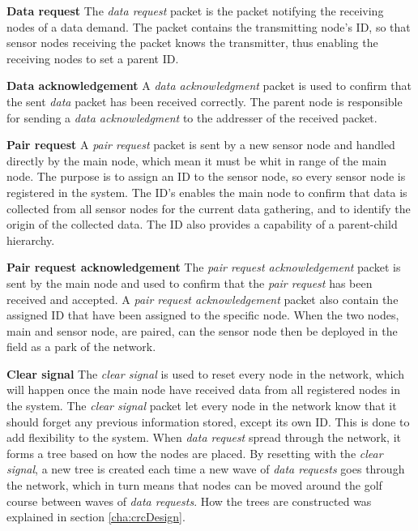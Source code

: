 \textbf{Data request}\newline 
The \textit{data request} packet is the packet notifying the receiving nodes of a data demand. 
The packet contains the transmitting node's ID, so that sensor nodes receiving the packet knows the transmitter, thus enabling the receiving nodes to set a parent ID.

\textbf{Data acknowledgement}\newline
A \textit{data acknowledgment} packet is used to confirm that the sent \textit{data} packet has been received correctly. The parent node is responsible for sending a \textit{data acknowledgment} to the addresser of the received packet. 

\textbf{Pair request}\newline
A \textit{pair request} packet is sent by a new sensor node and handled directly by the main node, which mean it must be whit in range of the main node. The purpose is to assign an ID to the sensor node, so every sensor node is registered in the system. The ID's enables the main node to confirm that data is collected from all sensor nodes for the current data gathering, and to identify the origin of the collected data. The ID also provides a capability of a parent-child hierarchy.

\textbf{Pair request acknowledgement}\newline
The \textit{pair request acknowledgement} packet is sent by the main node and used to confirm that the \textit{pair request} has been received and accepted. A \textit{pair request acknowledgement} packet also contain the assigned ID that have been assigned to the specific node. When the two nodes, main and sensor node, are paired, can the sensor node then be deployed in the field as a park of the network. 

\textbf{Clear signal}\newline
The \textit{clear signal} is used to reset every node in the network, which will happen once the main node have received data from all registered nodes in the system.
The \textit{clear signal} packet let every node in the network know that it should forget any previous information stored, except its own ID. This is done to add flexibility to the system. When \textit{data request} spread through the network, it forms a tree based on how the nodes are placed. By resetting with the \textit{clear signal}, a new tree is created each time a new wave of \textit{data requests} goes through the network, which in turn means that nodes can be moved around the golf course between waves of \textit{data requests}. How the trees are constructed was explained in section \ref{cha:crcDesign}.

